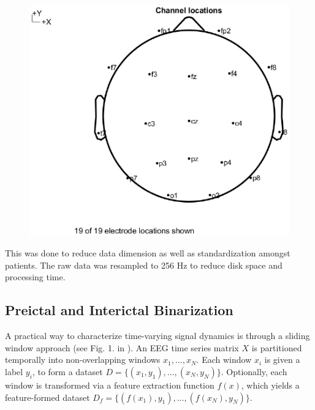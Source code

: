 \begin{figure}[h]
    \centering
    \includegraphics{c2Deterministic/Figs/PSP/topomap.eps}
    \label{fig:c2det:channellocs}
\end{figure}

This was done to reduce data dimension as well as standardization amongst patients.
The raw data was resampled to 256 Hz to reduce disk space and processing time.


\subsection{Preictal and Interictal Binarization}
\label{c2:labeling}
A practical way to characterize time-varying signal dynamics is through a sliding window approach (see Fig. 1. in \cite{lehnertz2017capturing}). An EEG time series matrix $X$ is partitioned temporally into non-overlapping windows $x_1, ..., x_N$. Each window $x_i$ is given a label $y_i$, to form a dataset $D = \{(x_1, y_1),...,(x_N,y_N)\}$. Optionally, each window is transformed via a feature extraction function $f(x)$, which yields a feature-formed dataset $D_f = \{(f(x_1), y_1),...,(f(x_N),y_N)\}$.

